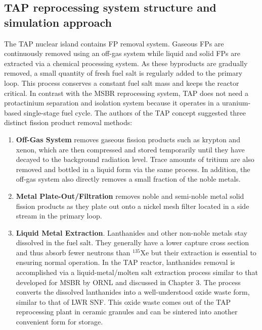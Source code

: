 \subsection{TAP reprocessing system structure and simulation approach}
The \gls{TAP} nuclear island contains \gls{FP} removal system. Gaseous 
\glspl{FP} are continuously removed using an off-gas system while liquid 
and solid \glspl{FP} are extracted via a chemical processing system. As 
these byproducts are gradually removed, a small quantity 
of fresh fuel salt is regularly added to the primary loop. This process conserves a 
constant fuel salt mass and keeps the reactor critical. In contrast with the \gls{MSBR} 
reprocessing system, \gls{TAP} does not need a protactinium separation and isolation 
system because it operates in a uranium-based single-stage fuel cycle. The authors of 
the \gls{TAP} concept suggested three distinct fission product removal methods: 
\begin{enumerate}
	\item \textbf{Off-Gas System} removes gaseous fission products such as krypton 
and xenon, 
which are then compressed and stored temporarily until they have decayed to the background 
radiation level. Trace amounts of tritium are also removed and bottled in a liquid form 
via the same process. In addition, the off-gas system also directly removes a small 
fraction of the noble metals.
	\item \textbf{Metal Plate-Out/Filtration} removes noble and semi-noble metal 
solid fission 
products as they plate out onto a nickel mesh filter located in a side stream in the 
primary loop.
	\item \textbf{Liquid Metal Extraction}. Lanthanides and other non-noble 
metals stay dissolved in the fuel salt. They generally have a lower capture cross 
section and thus absorb fewer neutrons than $^{135}$Xe but their extraction is essential 
to ensuring normal operation. In the \gls{TAP} reactor, lanthanides removal is
accomplished via 
a liquid-metal/molten salt extraction process similar to that developed for \gls{MSBR} 
by \gls{ORNL} \cite{robertson_conceptual_1971} and discussed in Chapter 3. The process 
converts the dissolved lanthanides into a well-understood oxide waste form, similar to 
that of \gls{LWR} \gls{SNF}. This oxide waste comes out of the \gls{TAP} reprocessing 
plant in ceramic granules and can be sintered into another convenient form for storage.
\end{enumerate}

